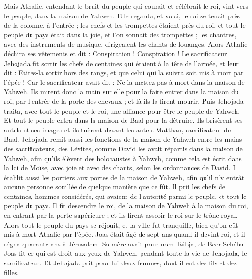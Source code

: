 \begin{multicols}{2}
Mais Athalie, entendant le bruit du peuple qui courait et célébrait le roi, vint vers le peuple, dans la maison de Yahweh.
Elle regarda, et voici, le roi se tenait près de la colonne, à l'entrée ; les chefs et les trompettes étaient près du roi, et tout le peuple du pays était dans la joie, et l'on sonnait des trompettes ; les chantres, avec des instruments de musique, dirigeaient les chants de louanges. Alors Athalie déchira ses vêtements et dit : Conspiration ! Conspiration !
Le sacrificateur Jehojada fit sortir les chefs de centaines qui étaient à la tête de l'armée, et leur dit : Faites-la sortir hors des rangs, et que celui qui la suivra soit mis à mort par l'épée ! Car le sacrificateur avait dit : Ne la mettez pas à mort dans la maison de Yahweh.
Ils mirent donc la main sur elle pour la faire entrer dans la maison du roi, par l'entrée de la porte des chevaux ; et là ils la firent mourir.
Puis Jehojada traita, avec tout le peuple et le roi, une alliance pour être le peuple de Yahweh.
Et tout le peuple entra dans la maison de Baal pour la détruire. Ils brisèrent ses autels et ses images et ils tuèrent devant les autels Matthan, sacrificateur de Baal.
Jehojada remit aussi les fonctions de la maison de Yahweh entre les mains des sacrificateurs, des Lévites, comme David les avait répartis dans la maison de Yahweh, afin qu'ils élèvent des holocaustes à Yahweh, comme cela est écrit dans  la loi de Moïse, avec joie et avec des chants, selon les ordonnances de David.
Il établit aussi les portiers aux portes de la maison de Yahweh, afin qu'il n’y entrât aucune personne souillée de quelque manière que ce fût.
Il prit les chefs de centaines, hommes considérés, qui avaient de l’autorité parmi le peuple, et tout le peuple du pays. Il fit descendre le roi, de la maison de Yahweh à la maison du roi, en entrant par la porte supérieure ; et ils firent asseoir le roi sur le trône royal.
Alors tout le peuple du pays se réjouit, et la ville fut tranquille, bien qu'on eût mis à mort Athalie par l'épée.
\VerseOne{}Joas était âgé de sept ans quand il devint roi, et il régna quarante ans à Jérusalem. Sa mère avait pour nom Tsibja, de Beer-Schéba.
Joas fit ce qui est droit aux yeux de Yahweh, pendant toute la vie de Jehojada, le sacrificateur.
Et Jehojada prit pour lui deux femmes, dont il eut des fils et des filles.

\end{multicols}
